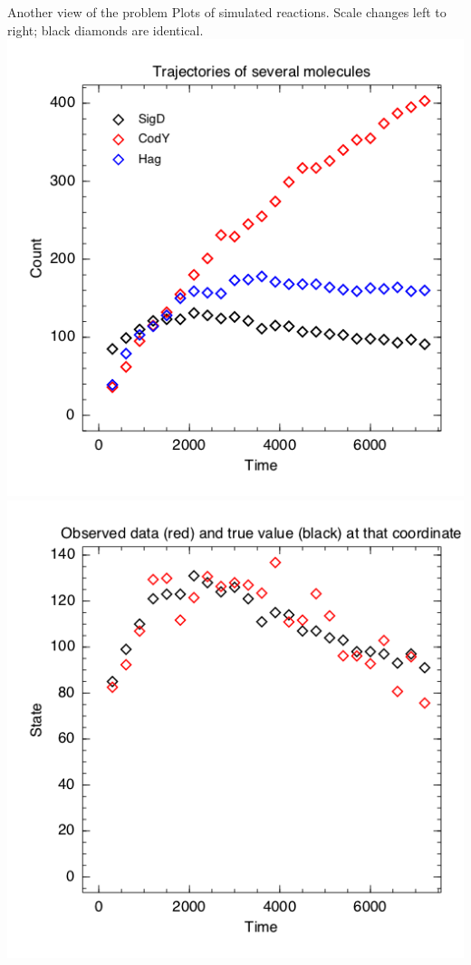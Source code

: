 \documentclass[12pt,a4paper,t,xcolor=dvipsnames,slidestop,compress,mathserif]{beamer}
\begin{document}


\begin{frame}{Another view of the problem}
Plots of simulated reactions. Scale changes left to right; black diamonds are identical.
\includegraphics[scale=0.30]{simulated_data_multiple_mols.png}
\includegraphics[scale=0.30]{simulated_data_obs.png}
\end{frame}
\end{document}
